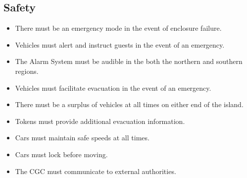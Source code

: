 \documentclass[12pt]{article}
\begin{document}
    \subsection{Safety}
    \begin{itemize}
        \item There must be an emergency mode in the event of enclosure failure.
        \item Vehicles must alert and instruct guests in the event of an emergency.
        \item The Alarm System must be audible in the both the northern and southern regions.
        \item Vehicles must facilitate evacuation in the event of an emergency.
        \item There must be a surplus of vehicles at all times on either end of the island.
        \item Tokens must provide additional evacuation information.
        \item Cars must maintain safe speeds at all times.
        \item Cars must lock before moving.
        \item The CGC must communicate to external authorities.
    \end{itemize}
\end{document}
